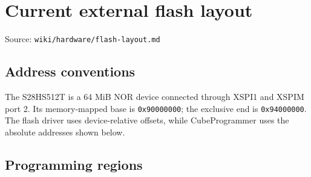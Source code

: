 \documentclass[10pt,a4paper,oneside]{report}
\begin{document}
\chapter{Current external flash layout}\label{wiki-hardware-flash-layout--current-external-flash-layout}

{\small\color{MGSMuted}Source: \nolinkurl{wiki/hardware/flash-layout.md}\par}\medskip

\section{Address conventions}\label{wiki-hardware-flash-layout--address-conventions}

The S28HS512T is a 64 MiB NOR device connected through XSPI1 and XSPIM port 2. Its memory-mapped base is \texttt{0x90000000}; the exclusive end is \texttt{0x94000000}. The flash driver uses device-relative offsets, while CubeProgrammer uses the absolute addresses shown below.

\section{Programming regions}\label{wiki-hardware-flash-layout--programming-regions}
\end{document}

